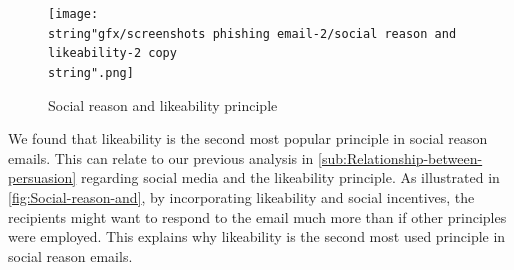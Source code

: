 \begin{figure}[h]
\centering{}\texttt{[image: \\string"gfx/screenshots phishing email-2/social reason and likeability-2 copy\\string".png]}\protect\caption{\label{fig:Social-reason-and}Social reason and likeability principle}
\end{figure}


We found that likeability is the second most popular principle in
social reason emails. This can relate to our previous analysis in
\autoref{sub:Relationship-between-persuasion} regarding social media
and the likeability principle. As illustrated in \autoref{fig:Social-reason-and},
by incorporating likeability and social incentives, the recipients
might want to respond to the email much more than if other principles
were employed. This explains why likeability is the second most used
principle in social reason emails.

